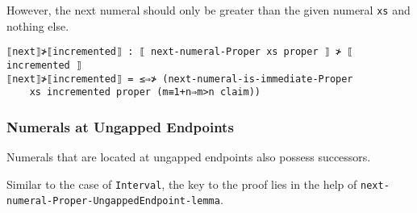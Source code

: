 \documentclass[\main/thesis.tex]{subfiles}
\begin{document}
However, the next numeral should only be greater than the given numeral
\lstinline|xs| and nothing else.

\begin{lstlisting}[basicstyle=\ttfamily\scriptsize]
⟦next⟧≯⟦incremented⟧ : ⟦ next-numeral-Proper xs proper ⟧ ≯ ⟦ incremented ⟧
⟦next⟧≯⟦incremented⟧ = ≤⇒≯ (next-numeral-is-immediate-Proper
    xs incremented proper (m≡1+n⇒m>n claim))
\end{lstlisting}

\subsubsection{Numerals at Ungapped Endpoints}

Numerals that are located at ungapped endpoints also possess successors.

\begin{center}
    \begin{adjustbox}{max width=\textwidth}
    \end{adjustbox}
\end{center}

Similar to the case of \lstinline|Interval|, the key to the proof lies in the
help of \lstinline|next-numeral-Proper-UngappedEndpoint-lemma|.
\end{document}
